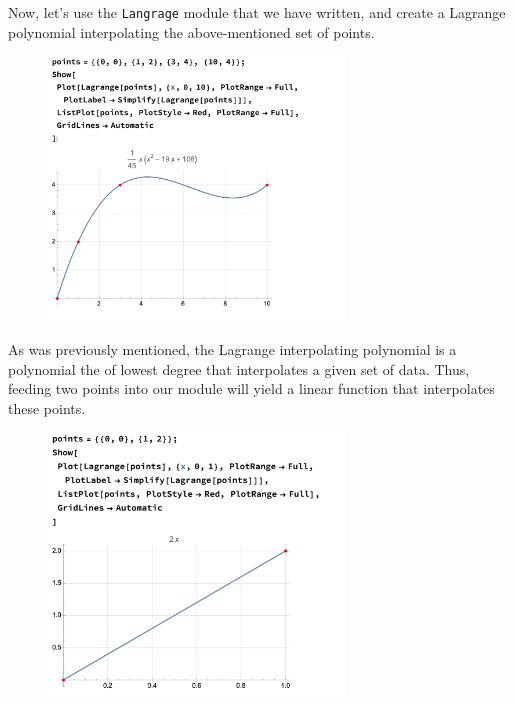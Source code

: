 \documentclass{MathematicaReport}
\begin{document}
Now, let's use the \texttt{Langrage} module that we have written, and create 
a Lagrange polynomial interpolating the above-mentioned set of points.
\begin{figure}[H]
\centering
\includegraphics[width=0.7\textwidth]{images/lagrange_example2.png}
\end{figure}

As was previously mentioned, the Lagrange interpolating polynomial is a 
polynomial the of lowest degree that interpolates a given set of data. Thus,
feeding two points into our module will yield a linear function that 
interpolates these points.
\begin{figure}[H]
\centering
\includegraphics[width=0.7\textwidth]{images/lagrange_example3.png}
\end{figure}
\end{document}
